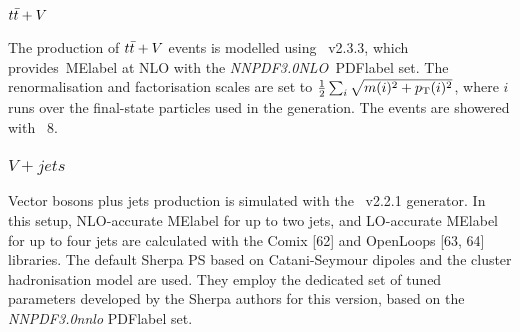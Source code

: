 \subsubsection{$t\bar{t}+V$}
The production of $t\bar{t}+V$ events is modelled using \MGMCatNLO~v2.3.3, which provides~\acrshort{MElabel} at
NLO with the \textit{NNPDF3.0NLO}~\acrshort{PDFlabel} set. The renormalisation and factorisation scales are set to $\frac{1}{2}\sum_i\sqrt{m(i)^2+p_{\text{T}}(i)^2}$, where $i$ runs over the final-state particles used in the generation. The events are showered with \PYTHIA~8.

\subsubsection{$V+jets$}
Vector bosons plus jets production is simulated with the \SHERPA~v2.2.1 generator. In this setup, NLO-accurate \acrshort{MElabel} for up to two jets, and LO-accurate \acrshort{MElabel} for up to four jets are calculated with the Comix [62] and OpenLoops [63, 64] libraries. %
The default Sherpa PS %
based on Catani-Seymour dipoles and the cluster hadronisation model are used. They employ the dedicated set of tuned parameters developed by the Sherpa authors for this version, based on the \textit{NNPDF3.0nnlo} \acrshort{PDFlabel} set. %

